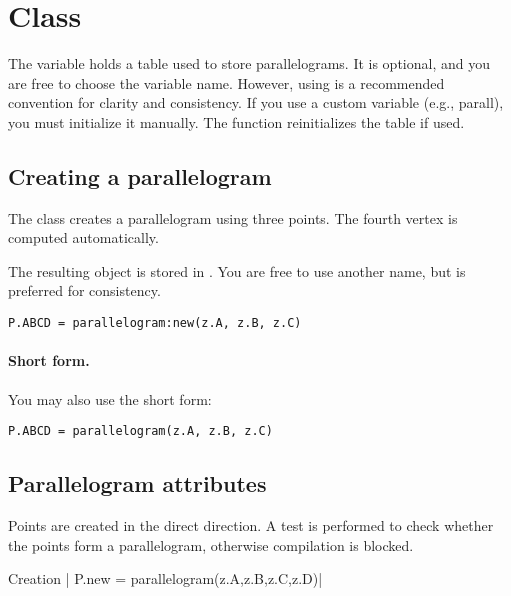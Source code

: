 \newpage
\section{Class }
The variable  holds a table used to store parallelograms. It is optional, and you are free to choose the variable name. However, using  is a recommended convention for clarity and consistency. If you use a custom variable (e.g., parall), you must initialize it manually. The  function reinitializes the  table if used.


\subsection{Creating a parallelogram}
\label{sub:creating_a_parallelogram}

The  class creates a parallelogram using three points. The fourth vertex is computed automatically.

\medskip
The resulting object is stored in . You are free to use another name, but  is preferred for consistency.

\begin{mybox}
\begin{verbatim}
P.ABCD = parallelogram:new(z.A, z.B, z.C)
\end{verbatim}
\end{mybox}

\paragraph{Short form.}
You may also use the short form:

\begin{mybox}
\begin{verbatim}
P.ABCD = parallelogram(z.A, z.B, z.C)
\end{verbatim}
\end{mybox}

\subsection{Parallelogram attributes}

Points are created in the direct direction. A test is performed to check whether the points form a parallelogram, otherwise compilation is blocked.

\begin{mybox}
Creation | P.new = parallelogram(z.A,z.B,z.C,z.D)|
\end{mybox}


